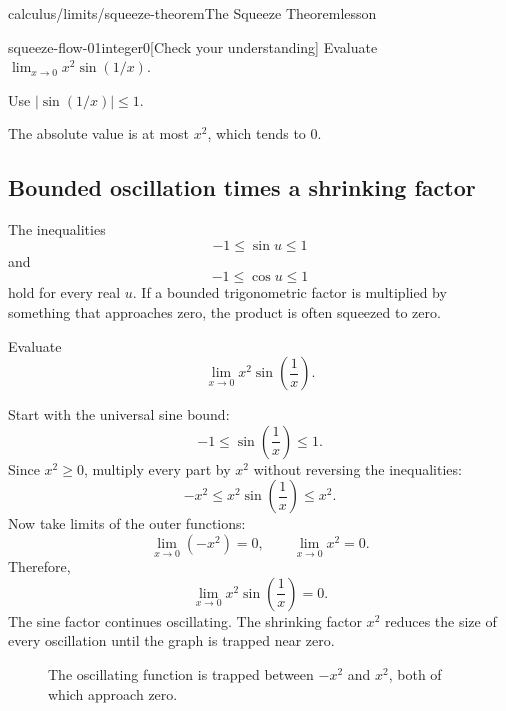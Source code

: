 \documentclass[11pt,openany]{book}
\theoremstyle{bgplain}
\newcounter{bgexample}[chapter]
\newcounter{bgcheck}[section]
\begin{document}
\begin{webpage}{calculus/limits/squeeze-theorem}{The Squeeze Theorem}{lesson}
\begin{bgcheck}{squeeze-flow-01}{integer}{0}[Check your understanding]
Evaluate \(\lim_{x\to0}x^2\sin(1/x)\).
\begin{bghint}
Use \(|\sin(1/x)|\le1\).
\end{bghint}
\begin{bgreveal}
The absolute value is at most \(x^2\), which tends to \(0\).
\end{bgreveal}
\end{bgcheck}



\subsection{Bounded oscillation times a shrinking factor}

The inequalities
\[
  -1\le\sin u\le1
\]
and
\[
  -1\le\cos u\le1
\]
hold for every real \(u\). If a bounded trigonometric factor is multiplied by something that approaches zero, the product is often squeezed to zero.

\begin{bgexample}[title={An oscillating function forced to zero}]
Evaluate
\[
  \lim_{x\to0}x^2\sin\left(\frac1x\right).
\]

\begin{bgsolution}
Start with the universal sine bound:
\[
  -1\le\sin\left(\frac1x\right)\le1.
\]
Since \(x^2\ge0\), multiply every part by \(x^2\) without reversing the inequalities:
\[
  -x^2\le x^2\sin\left(\frac1x\right)\le x^2.
\]
Now take limits of the outer functions:
\[
  \lim_{x\to0}(-x^2)=0,
  \qquad
  \lim_{x\to0}x^2=0.
\]
Therefore,
\[
  \boxed{\lim_{x\to0}x^2\sin\left(\frac1x\right)=0}.
\]
The sine factor continues oscillating. The shrinking factor \(x^2\) reduces the size of every oscillation until the graph is trapped near zero.
\end{bgsolution}
\end{bgexample}

\begin{figure}[htbp]
\centering
{}
\caption{The oscillating function is trapped between \(-x^2\) and \(x^2\), both of which approach zero.}
\label{fig:squeeze-oscillation}
\end{figure}


\end{webpage}
\end{document}
